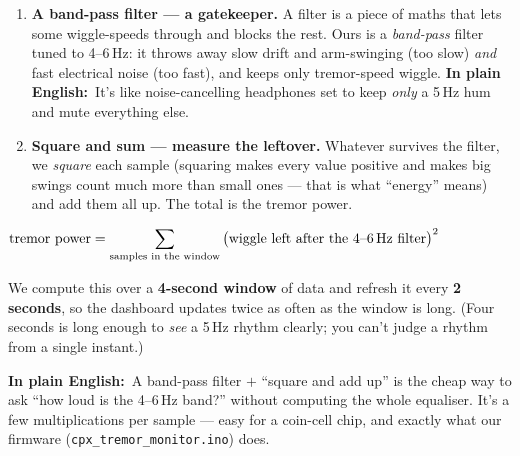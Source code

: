 \documentclass[11pt]{article}
\newcommand{\pe}{\textbf{\color{teal}In plain English:}\ }
\begin{document}
\begin{enumerate}
  \item \textbf{A band-pass filter --- a gatekeeper.} A filter is a piece of
        maths that lets some wiggle-speeds through and blocks the rest. Ours is
        a \emph{band-pass} filter tuned to 4--6\,Hz: it throws away slow drift
        and arm-swinging (too slow) \emph{and} fast electrical noise (too fast),
        and keeps only tremor-speed wiggle.
        \pe It's like noise-cancelling headphones set to keep \emph{only} a
        5\,Hz hum and mute everything else.
  \item \textbf{Square and sum --- measure the leftover.} Whatever survives the
        filter, we \emph{square} each sample (squaring makes every value
        positive and makes big swings count much more than small ones --- that
        is what ``energy'' means) and add them all up. The total is the tremor
        power.
\end{enumerate}

\begin{center}
\begin{tcolorbox}[enhanced, colback=white, colframe=teal, boxrule=1pt, arc=3pt,
   width=0.9\linewidth, halign=center, top=8pt, bottom=8pt]
  \large$\displaystyle
  \text{tremor power}=\sum_{\text{samples in the window}}
        \big(\text{wiggle left after the 4--6\,Hz filter}\big)^{2}$
\end{tcolorbox}
\end{center}

\noindent We compute this over a \textbf{4-second window} of data and refresh it
every \textbf{2 seconds}, so the dashboard updates twice as often as the window
is long. (Four seconds is long enough to \emph{see} a 5\,Hz rhythm clearly; you
can't judge a rhythm from a single instant.)

\begin{plain}
\pe A band-pass filter $+$ ``square and add up'' is the cheap way to ask ``how
loud is the 4--6\,Hz band?'' without computing the whole equaliser. It's a few
multiplications per sample --- easy for a coin-cell chip, and exactly what our
firmware (\texttt{cpx\_tremor\_monitor.ino}) does.
\end{plain}
\end{document}
